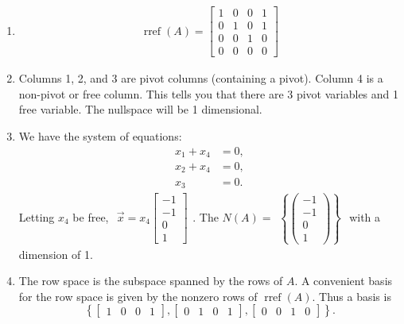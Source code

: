 \begin{Answer}[ref={ex:bigprob}]

\begin{enumerate}[label=\alph*]
    \item $$\begin{array}{c} \operatorname{rref}(A)=
\begin{bmatrix}
1 & 0 & 0 & 1\\
0 & 1 & 0 & 1\\
0 & 0 & 1 & 0\\
0 & 0 & 0 & 0
\end{bmatrix} \end{array}$$
\item Columns 1, 2, and 3 are pivot columns (containing a pivot). Column 4 is a non-pivot or free column. This tells you that there are 3 pivot variables and 1 free variable. The nullspace will be 1 dimensional.
\item We have the system of equations: $$\begin{aligned}
x_1 + x_4 &= 0,\\
x_2 + x_4 &= 0,\\
x_3 &= 0.
\end{aligned}$$
Letting $x_4$ be free, $\begin{array}{c} \vec x = x_4\begin{bmatrix}-1\\-1\\0\\1\end{bmatrix}\end{array}$. 
The $N(A) = \begin{array}{c} {\left\{ \begin{pmatrix}-1\\-1\\0\\1\end{pmatrix} \right\}} \end{array}$ with a dimension of 1. 
\item 
The row space is the subspace spanned by the rows of $A$. A convenient basis for the row space is given by the nonzero rows of $\operatorname{rref}(A)$. Thus a basis is
$${\left\{
\begin{bmatrix}1 & 0 & 0 & 1\end{bmatrix},
\begin{bmatrix}0 & 1 & 0 & 1\end{bmatrix},
\begin{bmatrix}0 & 0 & 1 & 0\end{bmatrix}
\right\}.}$$


\end{enumerate}
\end{Answer}
